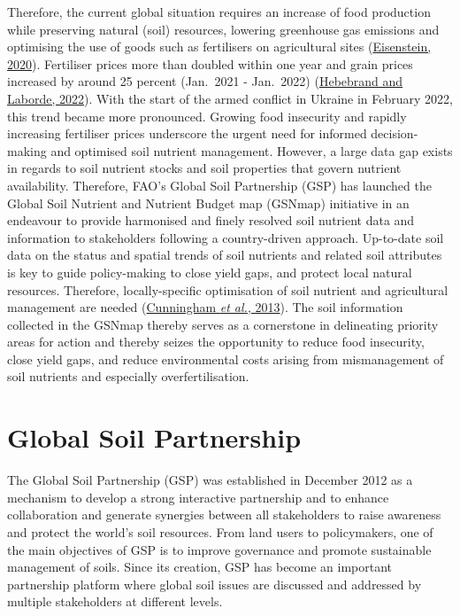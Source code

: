 \documentclass[
  10pt,
  b5paper,
  oneside]{book}
\begin{document}
Therefore, the current global situation requires an increase of food production while preserving natural (soil) resources, lowering greenhouse gas emissions and optimising the use of goods such as fertilisers on agricultural sites (\protect\hyperlink{ref-eisenstein2020}{Eisenstein, 2020}). Fertiliser prices more than doubled within one year and grain prices increased by around 25 percent (Jan.~2021 - Jan.~2022) (\protect\hyperlink{ref-ifpri2020}{Hebebrand and Laborde, 2022}). With the start of the armed conflict in Ukraine in February 2022, this trend became more pronounced.
Growing food insecurity and rapidly increasing fertiliser prices underscore the urgent need for informed decision-making and optimised soil nutrient management. However, a large data gap exists in regards to soil nutrient stocks and soil properties that govern nutrient availability. Therefore, FAO's Global Soil Partnership (GSP) has launched the Global Soil Nutrient and Nutrient Budget map (GSNmap) initiative in an endeavour to provide harmonised and finely resolved soil nutrient data and information to stakeholders following a country-driven approach.
Up-to-date soil data on the status and spatial trends of soil nutrients and related soil attributes is key to guide policy-making to close yield gaps, and protect local natural resources. Therefore, locally-specific optimisation of soil nutrient and agricultural management are needed (\protect\hyperlink{ref-cunningham2013}{Cunningham \emph{et al.}, 2013}). The soil information collected in the GSNmap thereby serves as a cornerstone in delineating priority areas for action and thereby seizes the opportunity to reduce food insecurity, close yield gaps, and reduce environmental costs arising from mismanagement of soil nutrients and especially overfertilisation.

\hypertarget{global-soil-partnership}{%
\section{Global Soil Partnership}\label{global-soil-partnership}}

The Global Soil Partnership (GSP) was established in December 2012 as a mechanism to develop a strong interactive partnership and to enhance collaboration and generate synergies between all stakeholders to raise awareness and protect the world's soil resources. From land users to policymakers, one of the main objectives of GSP is to improve governance and promote sustainable management of soils. Since its creation, GSP has become an important partnership platform where global soil issues are discussed and addressed by multiple stakeholders at different levels.
\end{document}

